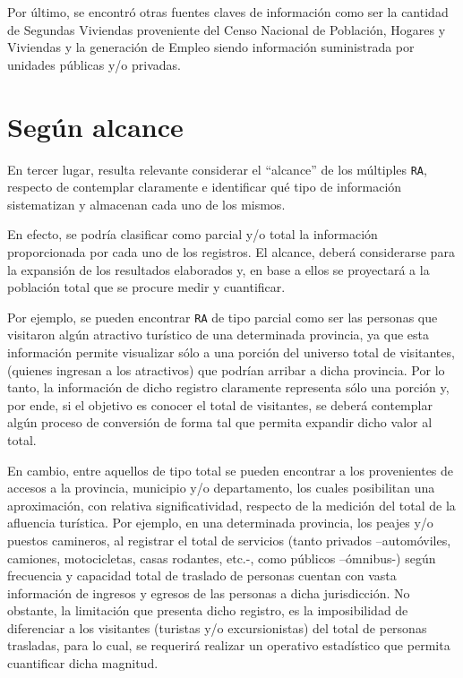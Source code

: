 \documentclass[
]{book}
\begin{document}
Por último, se encontró otras fuentes claves de información como ser la cantidad de Segundas Viviendas proveniente del Censo Nacional de Población, Hogares y Viviendas y la generación de Empleo siendo información suministrada por unidades públicas y/o privadas.

\hypertarget{seguxfan-alcance}{%
\section{Según alcance}\label{seguxfan-alcance}}

En tercer lugar, resulta relevante considerar el ``alcance'' de los múltiples \texttt{RA}, respecto de contemplar claramente e identificar qué tipo de información sistematizan y almacenan cada uno de los mismos.

En efecto, se podría clasificar como parcial y/o total la información proporcionada por cada uno de los registros. El alcance, deberá considerarse para la expansión de los resultados elaborados y, en base a ellos se proyectará a la población total que se procure medir y cuantificar.

Por ejemplo, se pueden encontrar \texttt{RA} de tipo parcial como ser las personas que visitaron algún atractivo turístico de una determinada provincia, ya que esta información permite visualizar sólo a una porción del universo total de visitantes, (quienes ingresan a los atractivos) que podrían arribar a dicha provincia. Por lo tanto, la información de dicho registro claramente representa sólo una porción y, por ende, si el objetivo es conocer el total de visitantes, se deberá contemplar algún proceso de conversión de forma tal que permita expandir dicho valor al total.

En cambio, entre aquellos de tipo total se pueden encontrar a los provenientes de accesos a la provincia, municipio y/o departamento, los cuales posibilitan una aproximación, con relativa significatividad, respecto de la medición del total de la afluencia turística. Por ejemplo, en una determinada provincia, los peajes y/o puestos camineros, al registrar el total de servicios (tanto privados --automóviles, camiones, motocicletas, casas rodantes, etc.-, como públicos --ómnibus-) según frecuencia y capacidad total de traslado de personas cuentan con vasta información de ingresos y egresos de las personas a dicha jurisdicción. No obstante, la limitación que presenta dicho registro, es la imposibilidad de diferenciar a los visitantes (turistas y/o excursionistas) del total de personas trasladas, para lo cual, se requerirá realizar un operativo estadístico que permita cuantificar dicha magnitud.\\
\end{document}
